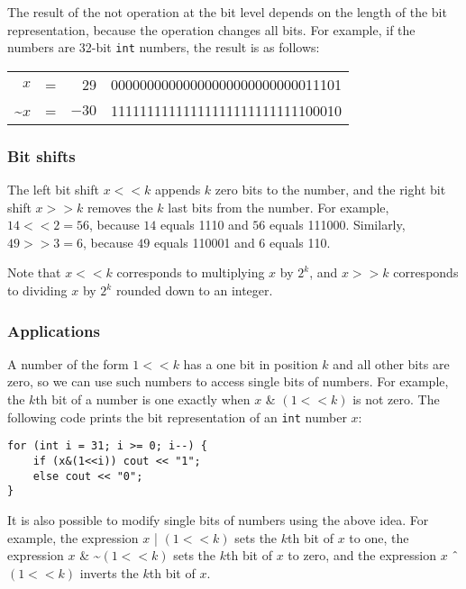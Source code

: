 The result of the not operation at the bit level
depends on the length of the bit representation,
because the operation changes all bits.
For example, if the numbers are 32-bit
\texttt{int} numbers, the result is as follows:

\begin{center}
\begin{tabular}{rrrr}
$x$ & = & 29 &   00000000000000000000000000011101 \\
\textasciitilde$x$ & = & $-30$ & 11111111111111111111111111100010 \\
\end{tabular}
\end{center}

\subsubsection{Bit shifts}


The left bit shift $x < < k$ appends $k$
zero bits to the number,
and the right bit shift $x > > k$
removes the $k$ last bits from the number.
For example, $14 < < 2 = 56$,
because $14$ equals 1110
and $56$ equals 111000.
Similarly, $49 > > 3 = 6$,
because $49$ equals 110001
and $6$ equals 110.

Note that $x < < k$
corresponds to multiplying $x$ by $2^k$,
and $x > > k$
corresponds to dividing $x$ by $2^k$
rounded down to an integer.

\subsubsection{Applications}

A number of the form $1 < < k$ has a one bit
in position $k$ and all other bits are zero,
so we can use such numbers to access single bits of numbers.
For example, the $k$th bit of a number is one
exactly when $x$ \& $(1 < < k)$ is not zero.
The following code prints the bit representation
of an \texttt{int} number $x$:

\begin{lstlisting}
for (int i = 31; i >= 0; i--) {
    if (x&(1<<i)) cout << "1";
    else cout << "0";
}
\end{lstlisting}

It is also possible to modify single bits
of numbers using the above idea.
For example, the expression $x$ | $(1 < < k)$
sets the $k$th bit of $x$ to one,
the expression
$x$ \& \textasciitilde $(1 < < k)$
sets the $k$th bit of $x$ to zero,
and the expression
$x$ $\XOR$ $(1 < < k)$
inverts the $k$th bit of $x$.

